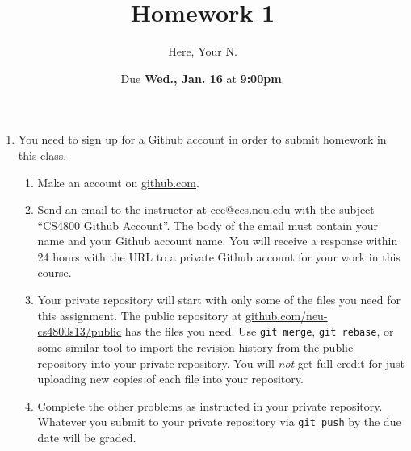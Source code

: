 \documentclass{article}
\title{Homework 1}
\author{Here, Your N.}
\date{Due \textbf{Wed., Jan. 16} at \textbf{9:00pm}.}
\begin{document}
\maketitle

\begin{enumerate}

\item
  You need to sign up for a Github account in order to submit homework in this
  class.
  \begin{enumerate}
  \item
    Make an account on \url{github.com}.
  \item
    Send an email to the instructor at \url{cce@ccs.neu.edu} with the subject
    ``CS4800 Github Account''.  The body of the email must contain your name and
    your Github account name.  You will receive a response within 24 hours with
    the URL to a private Github account for your work in this course.
  \item
    Your private repository will start with only some of the files you need for
    this assignment.  The public repository at
    \url{github.com/neu-cs4800s13/public} has the files you need.  Use
    \texttt{git merge}, \texttt{git rebase}, or some similar tool to import the
    revision history from the public repository into your private repository.
    You will \emph{not} get full credit for just uploading new copies of each
    file into your repository.
  \item
    Complete the other problems as instructed in your private repository.
    Whatever you submit to your private repository via \texttt{git push} by the
    due date will be graded.
  \end{enumerate}


\end{enumerate}
\end{document}
